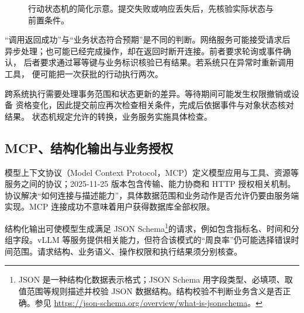 \begin{figure}[htbp]
\centering
{}
\caption{行动状态机的简化示意。提交失败或响应丢失后，先核验实际状态与前置条件。}
\label{fig:action-state-machine}
\end{figure}

“调用返回成功”与“业务状态符合预期”是不同的判断。网络服务可能接受请求后
异步处理；也可能已经完成操作，却在返回时断开连接。前者要求轮询或事件确认，
后者要求通过幂等键与业务标识核验已有结果。若系统只在异常时重新调用工具，
便可能把一次获批的行动执行两次。

跨系统执行需要处理事务范围和状态更新的差异。等待期间可能发生权限撤销或设备
资格变化，因此提交前应再次检查相关条件，完成后依据事件与对象状态核对结果。
状态机规定允许的转换，业务服务实施具体检查。

\subsection{MCP、结构化输出与业务授权}
模型上下文协议（Model Context Protocol，MCP）定义模型应用与工具、资源等服务之间的协议；2025-11-25 版本包含传输、能力协商和 HTTP 授权相关机制\cite{mcp10}。协议解决“如何连接与描述能力”，具体数据范围和业务动作是否允许仍要由服务端实现。MCP 连接成功不意味着用户获得数据库全部权限。

结构化输出可使模型生成满足 JSON Schema\footnote{JSON 是一种结构化数据表示格式；JSON Schema 用字段类型、必填项、取值范围等规则描述并校验 JSON 数据结构。结构校验不判断业务含义是否正确。参见 \url{https://json-schema.org/overview/what-is-jsonschema}。}的请求，例如包含指标名、时间和分组字段。vLLM 等服务提供相关能力\cite{vllm10,vllmStructured}，但符合该模式的“周良率”仍可能选择错误时间范围。请求结构、业务语义、操作权限和执行结果须分别核查。

